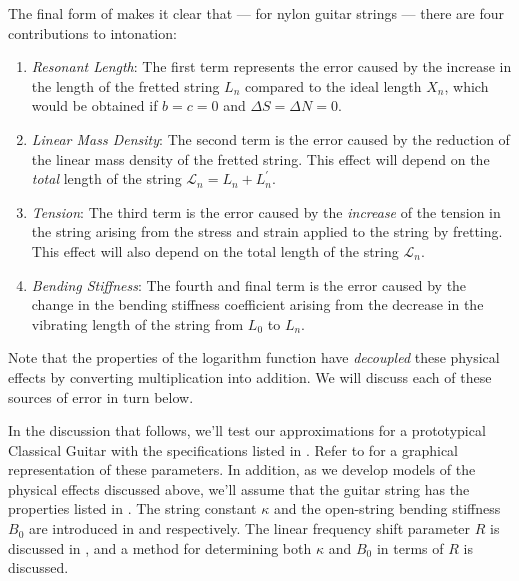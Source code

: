 The final form of  makes it clear that --- for nylon guitar strings --- there are four contributions to intonation:
 \begin{enumerate}
  \item
   \emph{Resonant Length}: The first term represents the error caused by the increase in the length of the fretted string $L_n$ compared to the ideal length $X_n$, which would be obtained if $b = c = 0$ and $\Delta S = \Delta N = 0$.
  \item
   \emph{Linear Mass Density}: The second term is the error caused by the reduction of the linear mass density of the fretted string. This effect will depend on the \emph{total} length of the string $\mathcal{L}_n = L_n + L^\prime_n$.
  \item
   \emph{Tension}: The third term is the error caused by the \emph{increase} of the tension in the string arising from the stress and strain applied to the string by fretting. This effect will also depend on the total length of the string $\mathcal{L}_n$.
  \item
   \emph{Bending Stiffness}: The fourth and final term is the error caused by the change in the bending stiffness coefficient arising from the decrease in the vibrating length of the string from $L_0$ to $L_n$.
 \end{enumerate}
Note that the properties of the logarithm function have \emph{decoupled} these physical effects by converting multiplication into addition. We will discuss each of these sources of error in turn below.

In the discussion that follows, we'll test our approximations for a prototypical Classical Guitar with the specifications listed in . Refer to  for a graphical representation of these parameters. In addition, as we develop models of the physical effects discussed above, we'll assume that the guitar string has the properties listed in . The string constant $\kappa$ and the open-string bending stiffness $B_0$ are introduced in  and  respectively. The linear frequency shift parameter $R$ is discussed in , and a method for determining both $\kappa$ and $B_0$ in terms of $R$ is discussed.

